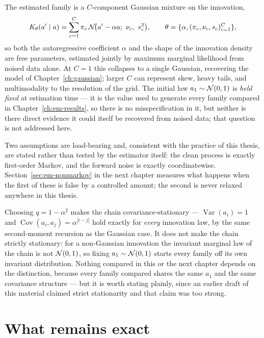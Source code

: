 The estimated family is a $C$-component Gaussian mixture on the innovation,
\begin{equation}
  K_\theta(a' \mid a) = \sum_{c=1}^{C} \pi_c \,
    \mathcal{N}\!\big(a' - \alpha a;\ \nu_c,\ s_c^2\big),
  \qquad \theta = \{\alpha, (\pi_c,\nu_c,s_c)_{c=1}^C\},
  \label{eq:em-mixture-kernel}
\end{equation}
so both the autoregressive coefficient $\alpha$ and the shape of the
innovation density are free parameters, estimated jointly by maximum marginal
likelihood from noised data alone. At $C=1$ this collapses to a single
Gaussian, recovering the model of Chapter~\ref{ch:gaussian}; larger $C$ can
represent skew, heavy tails, and multimodality to the resolution of the
grid. The initial law $a_1 \sim \mathcal{N}(0,1)$ is \emph{held fixed} at
estimation time --- it is the value used to generate every family compared in
Chapter~\ref{ch:em-results}, so there is no misspecification in it, but
neither is there direct evidence it could itself be recovered from noised
data; that question is not addressed here.

Two assumptions are load-bearing and, consistent with the practice of this
thesis, are stated rather than tested by the estimator itself: the clean
process is exactly first-order Markov, and the forward noise is exactly
coordinatewise. Section~\ref{sec:em-nonmarkov} in the next chapter measures
what happens when the first of these is false by a controlled amount; the
second is never relaxed anywhere in this thesis.

\begin{remark}
Choosing $q=1-\alpha^2$ makes the chain covariance-stationary --- $\operatorname{Var}(a_i)=1$
and $\operatorname{Cov}(a_i,a_j)=\alpha^{|i-j|}$ hold exactly for \emph{every} innovation
law, by the same second-moment recursion as the Gaussian case. It does not
make the chain strictly stationary: for a non-Gaussian innovation the
invariant marginal law of the chain is not $\mathcal{N}(0,1)$, so fixing $a_1\sim
\mathcal{N}(0,1)$ starts every family off its own invariant distribution. Nothing
compared in this or the next chapter depends on the distinction, because every
family compared shares the same $a_1$ and the same covariance structure --- but
it is worth stating plainly, since an earlier draft of this material claimed
strict stationarity and that claim was too strong.
\end{remark}

\section{What remains exact}\label{sec:em-exact}

